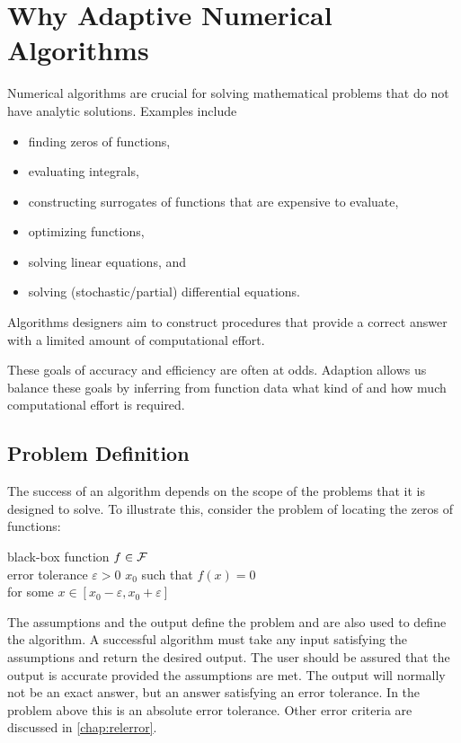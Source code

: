 \chapter{Why Adaptive Numerical Algorithms}
Numerical algorithms are crucial for solving mathematical problems that do not have analytic solutions.  Examples include 
\begin{itemize}
    \item finding zeros of functions,
    \item evaluating integrals,
    \item constructing surrogates of functions that are expensive to evaluate,
    \item optimizing functions,
    \item solving linear equations, and
    \item solving (stochastic/partial) differential equations.
\end{itemize}
Algorithms designers aim to construct procedures that provide a correct answer with a limited amount of computational effort.  

These goals of accuracy and efficiency are often at odds.  Adaption allows us balance these goals by inferring from function data what kind of and how much computational effort is required.

\section{Problem Definition}

The success of an algorithm depends on the scope of the problems that it is designed to solve.  To illustrate this, consider the problem of locating the zeros of functions:
\begin{NumProblem} \label{prob:findzero}
%
{black-box function $f \in \mathcal{F}$ \\ error tolerance $\varepsilon > 0$ }%
{$x_0$ such that $f(x) = 0$ \\ 
    \qquad for some $x \in [x_0 - \varepsilon, x_0 + \varepsilon]$}
\end{NumProblem}

The assumptions and the output define the problem and are also used to define the algorithm. A successful algorithm must take any input satisfying the assumptions and return the desired output.   The user should be assured that the output is accurate provided the assumptions are met.  The output will normally not be an exact answer, but an answer satisfying an error tolerance.  In the problem above this is an absolute error tolerance.  Other error criteria are discussed in \cref{chap:relerror}.

